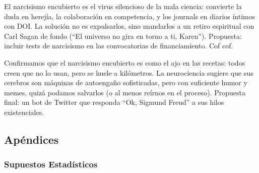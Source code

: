 \documentclass[
]{article}
\begin{document}
El narcisismo encubierto es el virus silencioso de la mala ciencia:
convierte la duda en herejía, la colaboración en competencia, y los
journals en diarios íntimos con DOI. La solución no es expulsarlos, sino
mandarlos a un retiro espiritual con Carl Sagan de fondo (``El universo
no gira en torno a ti, Karen''). Propuesta: incluir tests de narcisismo
en las convocatorias de financiamiento. Cof cof.

Confirmamos que el narcisismo encubierto es como el ajo en las recetas:
todos creen que no lo usan, pero se huele a kilómetros. La neurociencia
sugiere que sus cerebros son máquinas de autoengaño sofisticadas, pero
con suficiente humor y memes, quizá podamos salvarlos (o al menos
reírnos en el proceso). Propuesta final: un bot de Twitter que responda
``Ok, Sigmund Freud'' a sus hilos existenciales.

\subsection{Apéndices}\label{apuxe9ndices}

\subsubsection{Supuestos Estadísticos}\label{supuestos-estaduxedsticos}
\end{document}
